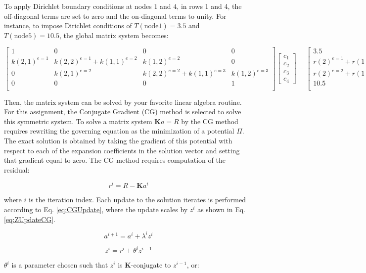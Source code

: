 \documentclass[10pt]{article}
\newcommand{\beq}{\begin{equation}}
\newcommand{\eeq}{\end{equation}}
\begin{document}
To apply Dirichlet boundary conditions at nodes \(1\) and \(4\), in rows 1 and 4, the off-diagonal terms are set to zero and the on-diagonal terms to unity. For instance, to impose Dirichlet conditions of \(T(\textrm{node} 1)=3.5\) and \(T(\textrm{node} 5) = 10.5\), the global matrix system becomes:

\beq
\begin{bmatrix}
1 & 0 & 0 & 0\\
k(2, 1)^{e=1} & k(2, 2)^{e=1}+k(1, 1)^{e=2} & k(1, 2)^{e=2} & 0\\
0 & k(2, 1)^{e=2} & k(2, 2)^{e=2}+k(1, 1)^{e=3} & k(1, 2)^{e=3}\\
0 & 0 & 0 & 1\\
\end{bmatrix}
\begin{bmatrix}
c_1\\c_2\\c_3\\c_4
\end{bmatrix}
=\begin{bmatrix}
3.5\\ r(2)^{e=1}+r(1)^{e=2}\\r(2)^{e=2}+r(1)^{e=3}\\10.5\\
\end{bmatrix}
\eeq

Then, the matrix system can be solved by your favorite linear algebra routine. For this assignment, the Conjugate Gradient (CG) method is selected to solve this symmetric system. To solve a matrix system \(\textbf{K}a=R\) by the CG method requires rewriting the governing equation as the minimization of a potential \(\Pi\). The exact solution is obtained by taking the gradient of this potential with respect to each of the expansion coefficients in the solution vector and setting that gradient equal to zero. The CG method requires computation of the residual:

\beq
r^i=R-\textbf{K}a^i
\eeq

where \(i\) is the iteration index. Each update to the solution iterates is performed according to Eq. \eqref{eq:CGUpdate}, where the update scales by \(z^i\) as shown in Eq. \eqref{eq:ZUpdateCG}.

\beq
\label{eq:CGUpdate}
a^{i+1}=a^i+\lambda^iz^i
\eeq

\beq
\label{eq:ZUpdateCG}
z^i=r^i+\theta^iz^{i-1}
\eeq

\(\theta^i\) is a parameter chosen such that \(z^i\) is \(\textbf{K}\)-conjugate to \(z^{i-1}\), or:
\end{document}
